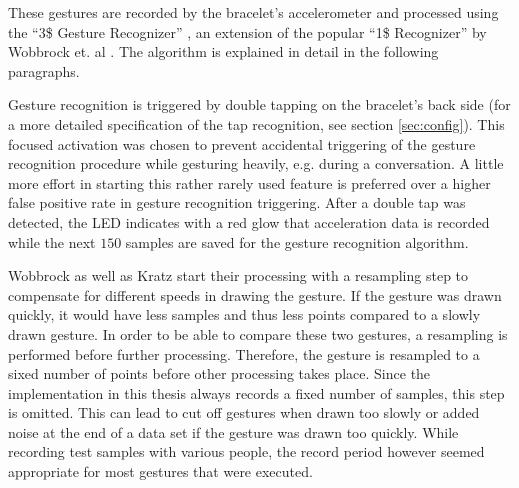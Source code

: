 These gestures are recorded by the bracelet's accelerometer and processed using the ``3\$ Gesture Recognizer'' \cite{Kratz2010}, an extension of the popular ``1\$ Recognizer'' by Wobbrock et. al \cite{Wobbrock2007}. The algorithm is explained in detail in the following paragraphs.

Gesture recognition is triggered by double tapping on the bracelet's back side (for a more detailed specification of the tap recognition, see section \ref{sec:config}). This focused activation was chosen to prevent accidental triggering of the gesture recognition procedure while gesturing heavily, e.g. during a conversation. A little more effort in starting this rather rarely used feature is preferred over a higher false positive rate in gesture recognition triggering. After a double tap was detected, the \ac{LED} indicates with a red glow that acceleration data is recorded while the next $150$ samples are saved for the gesture recognition algorithm.

Wobbrock as well as Kratz start their processing with a resampling step to compensate for different speeds in drawing the gesture. If the gesture was drawn quickly, it would have less samples and thus less points compared to a slowly drawn gesture. In order to be able to compare these two gestures, a resampling is performed before further processing. Therefore, the gesture is resampled to a sixed number of points before other processing takes place. Since the implementation in this thesis always records a fixed number of samples, this step is omitted. This can lead to cut off gestures when drawn too slowly or added noise at the end of a data set if the gesture was drawn too quickly. While recording test samples with various people, the record period however seemed appropriate for most gestures that were executed.



